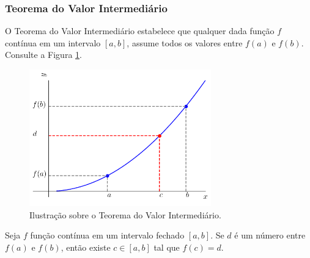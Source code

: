\subsubsection{Teorema do Valor Intermediário}

O Teorema do Valor Intermediário estabelece que qualquer dada função $f$ contínua em um intervalo $[a, b]$, assume todos os valores entre $f(a)$ e $f(b)$. Consulte a Figura \ref{fig:teo_valorint}.

\begin{figure}[H]
  \centering
  \includegraphics[width=0.7\textwidth]{cap_lim/dados/fig_teo_valorint/fig}
  \caption{Ilustração sobre o Teorema do Valor Intermediário.}
  \label{fig:teo_valorint}
\end{figure}

\begin{teo}\label{teo:valorintermediario}
  Seja $f$ função contínua em um intervalo fechado $[a, b]$. Se $d$ é um número entre $f(a)$ e $f(b)$, então existe $c\in [a, b]$ tal que $f(c)=d$.
\end{teo}



